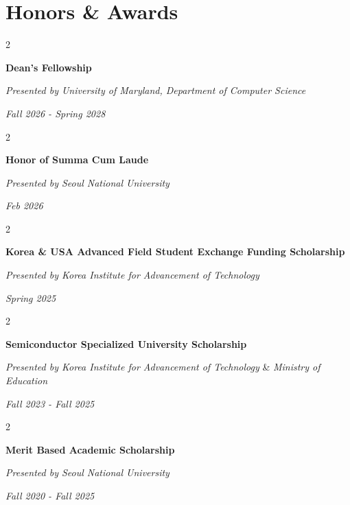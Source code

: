 \documentclass[10pt, letterpaper]{article}
\newenvironment{twocolentry}[2][]{
    \onecolentry
    \def\secondColumn{#2}
    \setcolumnwidth{\fill, 4.5 cm}
    \begin{paracol}{2}
}{
    \switchcolumn \raggedleft \secondColumn
    \end{paracol}
    \endonecolentry
} %
\begin{document}
    \vspace{0.3 cm}

    \section{Honors \& Awards}
        \begin{twocolentry}{
        \textit{Fall 2026 - Spring 2028}}
            \textbf{Dean's Fellowship}
            
            \textit{Presented by University of Maryland, Department of Computer Science}
        \end{twocolentry}
    
        \vspace{0.3 cm}
        
        \begin{twocolentry}{
        \textit{Feb 2026}}
            \textbf{Honor of Summa Cum Laude}
            
            \textit{Presented by Seoul National University}
        \end{twocolentry}
    
        \vspace{0.3 cm}

        \begin{twocolentry}{
        \textit{Spring 2025}}
            \textbf{Korea \& USA Advanced Field Student Exchange Funding Scholarship}
            
            \textit{Presented by Korea Institute for Advancement of Technology}
        \end{twocolentry}
    
        \vspace{0.3 cm}

        \begin{twocolentry}{
        \textit{Fall 2023 - Fall 2025}}
            \textbf{Semiconductor Specialized University Scholarship}
            
            \textit{Presented by Korea Institute for Advancement of Technology} \& \textit{Ministry of Education}
        \end{twocolentry}

        \vspace{0.3 cm}

        \begin{twocolentry}{
        \textit{Fall 2020 - Fall 2025}}
            \textbf{Merit Based Academic Scholarship}
            
            \textit{Presented by Seoul National University}
        \end{twocolentry}
\end{document}
